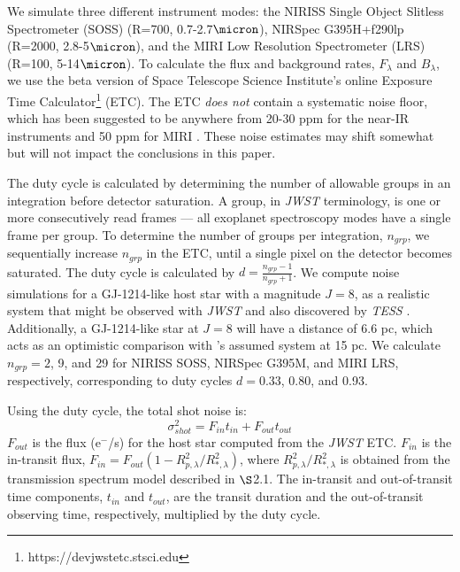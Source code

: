 \documentclass[iop]{emulateapj}
\begin{document}
We simulate three different instrument modes: the NIRISS Single Object Slitless Spectrometer (SOSS) (R=700, 0.7-2.7$\micron$), NIRSpec G395H+f290lp (R=2000, 2.8-5$\micron$), and the MIRI Low Resolution Spectrometer (LRS) (R=100, 5-14$\micron$). To calculate the flux and background rates, $F_{\lambda}$ and $B_{\lambda}$, we use the beta version of Space Telescope Science Institute's online Exposure Time Calculator\footnote{https://devjwstetc.stsci.edu} (ETC). The ETC \emph{does not} contain a systematic noise floor, which has been suggested to be anywhere from 20-30 ppm for the near-IR instruments and 50 ppm for MIRI \citep{gre16}. These noise estimates may shift somewhat but will not impact the conclusions in this paper. 

The duty cycle is calculated by determining the number of allowable groups in an integration before detector saturation. A group, in \emph{JWST} terminology, is one or more consecutively read frames --- all exoplanet spectroscopy modes have a single frame per group. To determine the number of groups per integration, $n_{grp}$, we sequentially increase $n_{grp}$ in the ETC, until a single pixel on the detector becomes saturated. The duty cycle is calculated by $d=\frac{n_{grp}-1}{n_{grp}+1}$.  We compute noise simulations for a GJ-1214-like host star with a magnitude $J=8$, as a realistic system that might be observed with \emph{JWST} and also discovered by \emph{TESS} \citep{sul15}. Additionally, a GJ-1214-like star at $J=8$ will have a distance of 6.6 pc, which acts as an optimistic comparison with \citet{dew13}'s assumed system at 15 pc.   
We calculate $n_{grp}= 2$, 9, and 29 for NIRISS SOSS, NIRSpec G395M, and MIRI LRS, respectively, corresponding to duty cycles $d = 0.33$, 0.80, and 0.93. 

Using the duty cycle, the total shot noise is:
\begin{equation}
\sigma_{shot}^2 = F_{in} t_{in}+F_{out} t_{out} 
\end{equation}
$F_{out}$ is the flux (e$^-$/s) for the host star computed from the \emph{JWST} ETC.  $F_{in}$ is the in-transit flux, $F_{in}=F_{out}(1-R_{p,\lambda}^2/R_{*,\lambda}^2)$, where $R_{p,\lambda}^2/R_{*,\lambda}^2$ is obtained from the transmission spectrum model described in $\S$2.1. The in-transit and out-of-transit time components, $t_{in}$ and $t_{out}$, are the transit duration and the out-of-transit observing time, respectively, multiplied by the duty cycle. 
\end{document}
